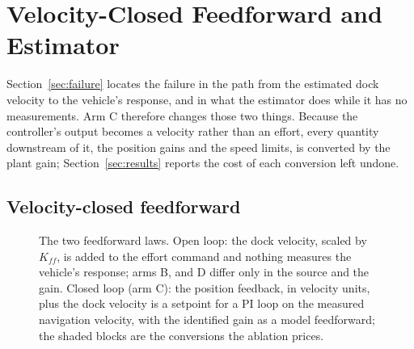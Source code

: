 \section{Velocity-Closed Feedforward and Estimator}
\label{sec:redesign}

Section~\ref{sec:failure} locates the failure in the path from the estimated dock velocity to the vehicle's response, and in what the estimator does while it has no measurements. Arm C therefore changes those two things. Because the controller's output becomes a velocity rather than an effort, every quantity downstream of it, the position gains and the speed limits, is converted by the plant gain; Section~\ref{sec:results} reports the cost of each conversion left undone.

\subsection{Velocity-closed feedforward}

\begin{figure}[t]
  \centering
  \resizebox{\columnwidth}{!}{}
  \caption{The two feedforward laws. Open loop: the dock velocity, scaled by $K_{ff}$, is added to the effort command and nothing measures the vehicle's response; arms B, \Bgt{} and D differ only in the source and the gain. Closed loop (arm C): the position feedback, in velocity units, plus the dock velocity is a setpoint for a PI loop on the measured navigation velocity, with the identified gain as a model feedforward; the shaded blocks are the conversions the ablation prices.}
  \label{fig:laws}
\end{figure}

